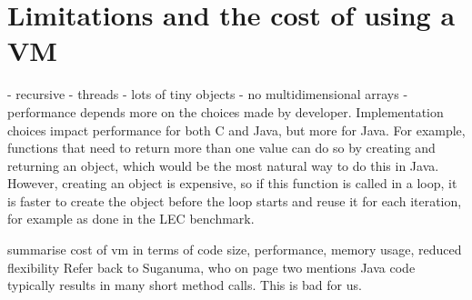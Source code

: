 
\section{Limitations and the cost of using a VM}
 - recursive
 - threads
 - lots of tiny objects
 - no multidimensional arrays
 - performance depends more on the choices made by developer. Implementation choices impact performance for both C and Java, but more for Java. For example, functions that need to return more than one value can do so by creating and returning an object, which would be the most natural way to do this in Java. However, creating an object is expensive, so if this function is called in a loop, it is faster to create the object before the loop starts and reuse it for each iteration, for example as done in the LEC benchmark.


summarise cost of vm in terms of code size, performance, memory usage, reduced flexibility
Refer back to Suganuma, who on page two mentions Java code typically results in many short method calls. This is bad for us.




